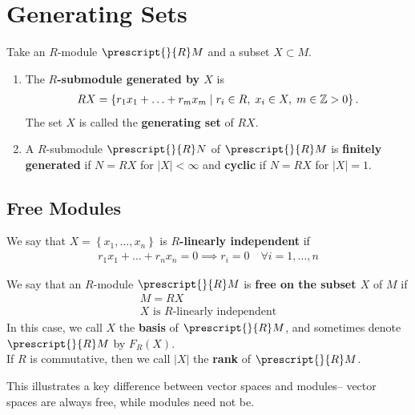 \documentclass{memoir}
\begin{document}


\section{Generating Sets}
\label{sec:generating_sets}

\begin{defn}
	Take an \(R\)-module \(\prescript{}{R}M\) and a subset \(X \subset M\).
	\begin{enumerate}
		\item The \textbf{\(R\)-submodule generated by \(X\)} is
			\begin{align*}
				RX = \left\{r_1x_1+\ldots+r_mx_m \mid r_i \in R, \; x_i \in X, \; m \in \mathbb{Z}>0 \right\} .
			\end{align*}
			The set \(X\) is called the \textbf{generating set} of \(RX\).
		\item A \(R\)-submodule \(\prescript{}{R}N\) of \(\prescript{}{R}M\) is \textbf{finitely generated} if \(N = RX\) for \(\left| X \right| <\infty\) and \textbf{cyclic} if \(N=RX\) for \(\left| X \right| =1\).
	\end{enumerate}
\end{defn}

\subsection{Free Modules}
\label{sub:free_modules}

\begin{defn}
	We say that \(X = \left\{x_1,\ldots,x_n \right\} \) is \textbf{\(R\)-linearly independent} if
	\begin{align*}
		r_1x_1+\ldots+r_nx_n = 0 \implies r_i = 0 \quad \forall i = 1,\ldots,n
	\end{align*}
\end{defn}

\begin{defn}
	We say that an \(R\)-module \(\prescript{}{R}M\) is \textbf{free on the subset \(X\)} of \(M\) if
	\begin{align*}
		M = RX\\
		X \text{ is \(R\)-linearly independent}
	\end{align*}
In this case, we call \(X\) the \textbf{basis} of \(\prescript{}{R}M\), and sometimes denote \(\prescript{}{R}M\) by \(F_R(X)\).\\

If \(R\) is commutative, then we call \(\left| X \right| \) the \textbf{rank} of \(\prescript{}{R}M\).
\end{defn}
This illustrates a key difference between vector spaces and modules-- vector spaces are always free, while modules need not be.
\end{document}
